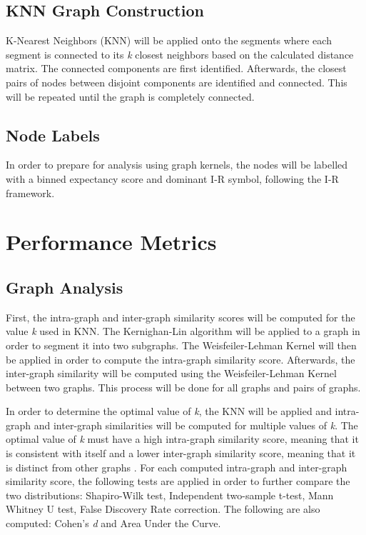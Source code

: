 \subsection{KNN Graph Construction}
K-Nearest Neighbors (KNN) will be applied onto the segments where each segment is connected to its \textit{k} closest neighbors based on the calculated distance matrix. The connected components are first identified. Afterwards, the closest pairs of nodes between disjoint components are identified and connected. This will be repeated until the graph is completely connected.

\subsection{Node Labels}
In order to prepare for analysis using graph kernels, the nodes will be labelled with a binned expectancy score and dominant I-R symbol, following the I-R framework.

\section{Performance Metrics}
\subsection{Graph Analysis}
First, the intra-graph and inter-graph similarity scores will be computed for the value \textit{k} used in KNN. The Kernighan-Lin algorithm will be applied to a graph in order to segment it into two subgraphs. The Weisfeiler-Lehman Kernel will then be applied in order to compute the intra-graph similarity score. Afterwards, the inter-graph similarity will be computed using the Weisfeiler-Lehman Kernel between two graphs. This process will be done for all graphs and pairs of graphs.

In order to determine the optimal value of \textit{k}, the KNN will be applied and intra-graph and inter-graph similarities will be computed for multiple values of \textit{k}. The optimal value of \textit{k} must have a high intra-graph similarity score, meaning that it is consistent with itself and a lower inter-graph similarity score, meaning that it is distinct from other graphs \cite{ConananEtAl}. For each computed intra-graph and inter-graph similarity score, the following tests are applied in order to further compare the two distributions: Shapiro-Wilk test, Independent two-sample t-test, Mann Whitney U test, False Discovery Rate correction. The following are also computed: Cohen's \textit{d} and Area Under the Curve.


